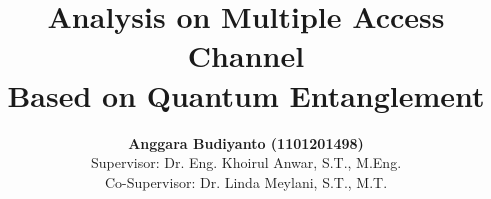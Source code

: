 
\title[Analisis Multiple Access Channel Berbasis Entanglement Kuantum]{%
    \textbf{Analysis on Multiple Access Channel\\Based on Quantum Entanglement}}

\author[Anggara Budiyanto]{%
    \textbf{Anggara Budiyanto (1101201498)} \\          %
    {\footnotesize \vspace{-0cm} Supervisor: Dr. Eng. Khoirul Anwar, S.T., M.Eng.}\\
    {\footnotesize Co-Supervisor: Dr. Linda Meylani, S.T., M.T.}
    \vspace{-0.4cm}%
}


